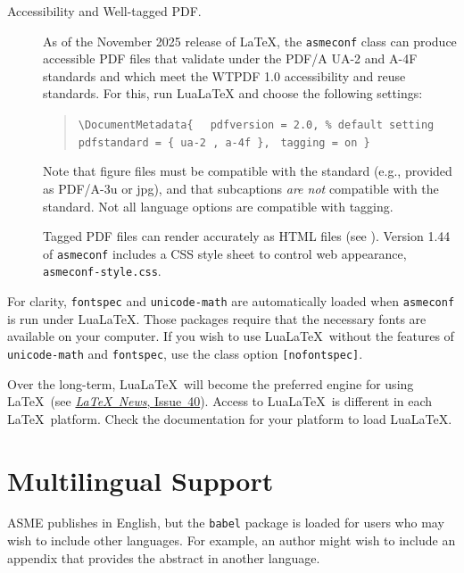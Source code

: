 \documentclass[colorlinks,upint,subscriptcorrection,varvw,hyphenate,balance,greek,russian,vietnamese,german]{asmeconf} %
\newcommand*\LuaLaTeX{Lua\LaTeX}
\begin{document}
\begin{description}
\item[Accessibility and Well-tagged PDF.] As of the November 2025 release of \LaTeX, the \texttt{asmeconf} class can produce accessible PDF files that validate under 
the PDF/A UA-2 and A-4F standards and which meet the WTPDF 1.0 accessibility and reuse standards. For this, run \LuaLaTeX{} and choose the following settings: 
 \begin{quote}
	\verb|\DocumentMetadata{ | \newline
	\verb| pdfversion = 2.0, % default setting | \newline
	\verb| pdfstandard = { ua-2 , a-4f },| \newline
	\verb| tagging = on }|
\end{quote}
Note that figure files must be compatible with the standard (e.g., provided as PDF/A-3u or jpg), and that subcaptions \emph{are not} compatible with the standard.  Not all language options are compatible with tagging.

Tagged PDF files can render accurately as HTML files (see ). Version 1.44 of \texttt{asmeconf} includes a CSS style sheet to control web appearance, \texttt{asmeconf-style.css}. 

\end{description}

For clarity, \texttt{fontspec} and \texttt{unicode-math} are automatically loaded when \texttt{asmeconf} is run under \LuaLaTeX. Those packages require that the necessary fonts are available on your computer.  If you wish to use \LuaLaTeX\  without the features of \texttt{unicode-math} and \texttt{fontspec}, use the class option \texttt{[nofontspec]}. 

Over the long-term, \LuaLaTeX\  will become the preferred engine for using \LaTeX\ (see \href{https://www.latex-project.org/news/latex2e-news/ltnews40.pdf}{\emph{LaTeX\ News}, Issue~40}). Access to \LuaLaTeX\  is different in each \LaTeX\ platform. Check the documentation for your platform to load \LuaLaTeX.

\section{Multilingual Support}\label{appendix:c}

ASME publishes in English, but the \texttt{babel} package is loaded for 
users who may wish to include other languages. For example, an author might wish to include an appendix that provides the 
abstract in another language.
\end{document}
